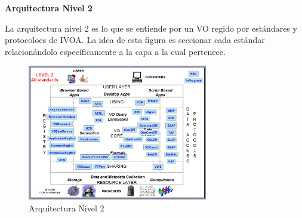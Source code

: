 \textbf{Arquitectura Nivel 2}%


La arquitectura nivel 2 es lo que se entiende por un VO regido por estándares
y protocoloes de IVOA.
La idea de esta figura es seccionar cada estándar relacionándolo específicamente
a la capa a la cual pertenece.

\begin{figure}[h!t]
    \centering
    \includegraphics[width=0.7\textwidth]{img/arquitectura_2.png}
    \caption{Arquitectura Nivel 2}
    \label{fig:nivel2}
\end{figure}
